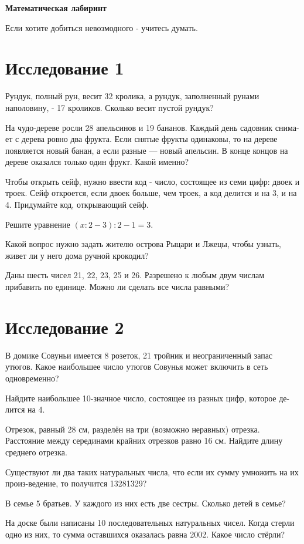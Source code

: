 \centerline{\bf \Huge Математическая лабиринт}

\begin{flushright}
        \scriptsize{Если хотите добиться невозмодного - учитесь думать.}
\end{flushright}


\section{Исследование 1}

Рундук, полный рун, весит 32 кролика, а рундук, заполненный рунами наполовину, - 17 кроликов. Сколько весит пустой рундук?


На чудо-дереве росли 28 апельсинов и 19 бананов. Каждый день садовник снима- ет с дерева ровно два фрукта. Если снятые фрукты одинаковы, то на дереве появляется новый банан, а если разные — новый апельсин. В конце концов на дереве оказался только один фрукт. Какой именно?


Чтобы открыть сейф, нужно ввести код - число, состоящее из семи цифр: двоек и троек. Сейф откроется, если двоек больше, чем троек, а код делится и на 3, и на 4. Придумайте код, открывающий сейф.

Решите уравнение $(x : 2 - 3) : 2 - 1 = 3.$

Какой вопрос нужно задать жителю острова Рыцари и Лжецы, чтобы узнать, живет ли у него дома ручной крокодил?

Даны шесть чисел 21, 22, 23, 25 и 26. Разрешено к любым двум числам прибавить по единице. Можно ли сделать все числа равными?


\newpage

\section{Исследование 2}

В домике Совуньи имеется 8 розеток, 21 тройник и неограниченный запас утюгов. Какое наибольшее число утюгов Совунья может включить в сеть одновременно?

Найдите наибольшее 10-значное число, состоящее из разных цифр, которое де- лится на 4.


Отрезок, равный 28 см, разделён на три (возможно неравных) отрезка. Расстояние между серединами крайних отрезков равно 16 см. Найдите длину среднего отрезка.

Существуют ли два таких натуральных числа, что если их сумму умножить на их произ-ведение, то получится 13281329?

В семье 5 братьев. У каждого из них есть две сестры. Сколько детей в семье?


На доске были написаны 10 последовательных натуральных чисел. Когда стерли одно из них, то сумма оставшихся оказалась равна 2002. Какое число стёрли?